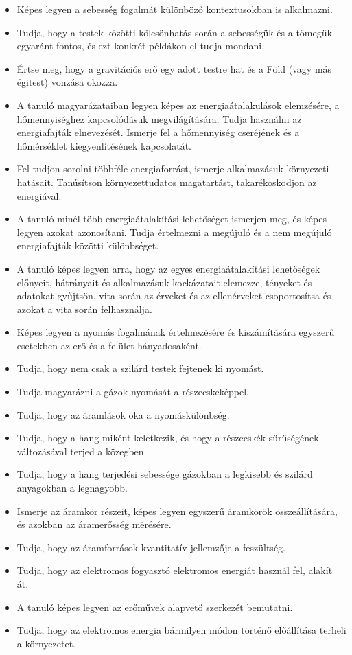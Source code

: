 \begin{itemize}
\item Képes legyen a sebesség fogalmát különböző kontextusokban is alkalmazni.
\item Tudja, hogy a testek közötti kölcsönhatás során a sebességük és a tömegük egyaránt fontos, és ezt konkrét példákon el tudja mondani.
\item Értse meg, hogy a gravitációs erő egy adott testre hat és a Föld (vagy más égitest) vonzása okozza.
\item A tanuló magyarázataiban legyen képes az energiaátalakulások elemzésére, a hőmennyiséghez kapcsolódásuk megvilágítására. Tudja használni az energiafajták elnevezését. Ismerje fel a hőmennyiség cseréjének és a hőmérséklet kiegyenlítésének kapcsolatát.
\item Fel tudjon sorolni többféle energiaforrást, ismerje alkalmazásuk környezeti hatásait. Tanúsítson környezettudatos magatartást, takarékoskodjon az energiával.
\item A tanuló minél több energiaátalakítási lehetőséget ismerjen meg, és képes legyen azokat azonosítani. Tudja értelmezni a megújuló és a nem megújuló energiafajták közötti különbséget.
\item A tanuló képes legyen arra, hogy az egyes energiaátalakítási lehetőségek előnyeit, hátrányait és alkalmazásuk kockázatait elemezze, tényeket és adatokat gyűjtsön, vita során az érveket és az ellenérveket csoportosítsa és azokat a vita során felhasználja.
\item Képes legyen a nyomás fogalmának értelmezésére és kiszámítására egyszerű esetekben az erő és a felület hányadosaként.
\item Tudja, hogy nem csak a szilárd testek fejtenek ki nyomást.
\item Tudja magyarázni a gázok nyomását a részecskeképpel.
\item Tudja, hogy az áramlások oka a nyomáskülönbség.
\item Tudja, hogy a hang miként keletkezik, és hogy a részecskék sűrűségének változásával terjed a közegben.
\item Tudja, hogy a hang terjedési sebessége gázokban a legkisebb és szilárd anyagokban a legnagyobb.
\item Ismerje az áramkör részeit, képes legyen egyszerű áramkörök összeállítására, és azokban az áramerősség mérésére.
\item Tudja, hogy az áramforrások kvantitatív jellemzője a feszültség.
\item Tudja, hogy az elektromos fogyasztó elektromos energiát használ fel, alakít át.
\item A tanuló képes legyen az erőművek alapvető szerkezét bemutatni.
\item Tudja, hogy az elektromos energia bármilyen módon történő előállítása terheli a környezetet.
\end{itemize}
